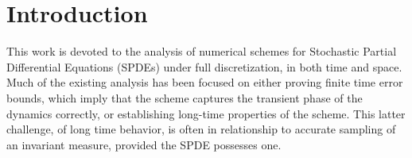 \documentclass[reqno, 11pt]{amsart}
\newcommand{\gsnote}[1]{\textcolor{Cerulean}{#1}}
\theoremstyle{plain}
\theoremstyle{definition}
\theoremstyle{remark}
\numberwithin{equation}{section}
\numberwithin{theorem}{section}
\begin{document}
\maketitle

\section{Introduction}



This work is devoted to the analysis of numerical schemes for Stochastic Partial Differential Equations (SPDEs) under full discretization, in both time and space.  Much of the existing analysis has been focused on either proving finite time error bounds, which imply that the scheme captures the transient phase of the dynamics correctly,  or establishing long-time properties of the scheme.  This latter challenge, of long time behavior, is often in relationship to accurate sampling of an invariant measure, provided the SPDE possesses one.


\end{document}
